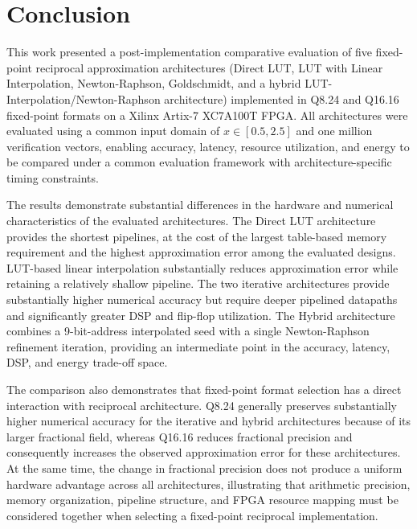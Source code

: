 \documentclass[manuscript,screen,review]{acmart}
\begin{document}
\section{Conclusion}
\label{sec:conclusion}

This work presented a post-implementation comparative evaluation of five fixed-point reciprocal approximation architectures (Direct LUT, LUT with Linear Interpolation, Newton-Raphson, Goldschmidt, and a hybrid LUT-Interpolation/Newton-Raphson architecture) implemented in Q8.24 and Q16.16 fixed-point formats on a Xilinx Artix-7 XC7A100T FPGA. All architectures were evaluated using a common input domain of $x \in [0.5, 2.5]$ and one million verification vectors, enabling accuracy, latency, resource utilization, and energy to be compared under a common evaluation framework with architecture-specific timing constraints.

The results demonstrate substantial differences in the hardware and numerical characteristics of the evaluated architectures. The Direct LUT architecture provides the shortest pipelines, at the cost of the largest table-based memory requirement and the highest approximation error among the evaluated designs. LUT-based linear interpolation substantially reduces approximation error while retaining a relatively shallow pipeline. The two iterative architectures provide substantially higher numerical accuracy but require deeper pipelined datapaths and significantly greater DSP and flip-flop utilization. The Hybrid architecture combines a 9-bit-address interpolated seed with a single Newton-Raphson refinement iteration, providing an intermediate point in the accuracy, latency, DSP, and energy trade-off space.

The comparison also demonstrates that fixed-point format selection has a direct interaction with reciprocal architecture. Q8.24 generally preserves substantially higher numerical accuracy for the iterative and hybrid architectures because of its larger fractional field, whereas Q16.16 reduces fractional precision and consequently increases the observed approximation error for these architectures. At the same time, the change in fractional precision does not produce a uniform hardware advantage across all architectures, illustrating that arithmetic precision, memory organization, pipeline structure, and FPGA resource mapping must be considered together when selecting a fixed-point reciprocal implementation.
\end{document}
